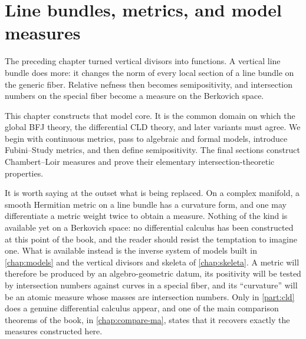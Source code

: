 \chapter{Line bundles, metrics, and model measures}
\label{chap:metrics}

The preceding chapter turned vertical divisors into functions. A vertical
line bundle does more: it changes the norm of every local section of a line
bundle on the generic fiber. Relative nefness then becomes semipositivity,
and intersection numbers on the special fiber become a measure on the
Berkovich space.

This chapter constructs that model core. It is the common domain on which the
global BFJ theory, the differential CLD theory, and later variants must agree.
We begin with continuous metrics, pass to algebraic and formal models,
introduce Fubini--Study metrics, and then define semipositivity. The final
sections construct Chambert--Loir measures and prove their elementary
intersection-theoretic properties.

It is worth saying at the outset what is being replaced. On a complex
manifold, a smooth Hermitian metric on a line bundle has a curvature form,
and one may differentiate a metric weight twice to obtain a measure. Nothing
of the kind is available yet on a Berkovich space: no differential calculus
has been constructed at this point of the book, and the reader should resist
the temptation to imagine one. What is available instead is the inverse
system of models built in \cref{chap:models} and the vertical divisors and
skeleta of \cref{chap:skeleta}. A metric will therefore be produced by an
algebro-geometric datum, its positivity will be tested by intersection
numbers against curves in a special fiber, and its ``curvature'' will be an
atomic measure whose masses are intersection numbers. Only in
\cref{part:cld} does a genuine differential calculus appear, and one of the
main comparison theorems of the book, in \cref{chap:compare-ma}, states that
it recovers exactly the measures constructed here.

